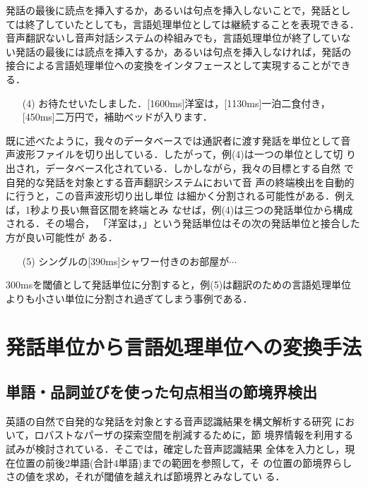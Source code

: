 発話の最後に読点を挿入するか，あるいは句点を挿入しないことで，発話とし
ては終了していたとしても，言語処理単位としては継続することを表現できる．
音声翻訳ないし音声対話システムの枠組みでも，言語処理単位が終了していな
い発話の最後には読点を挿入するか，あるいは句点を挿入しなければ，発話の
接合による言語処理単位への変換をインタフェースとして実現することができ
る．

\begin{itemize}
\item[(4)] お待たせいたしました．[1600ms]洋室は，[1130ms]一泊二食付き，
[450ms]二万円で，補助ベッドが入ります．
\end{itemize}

既に述べたように，我々のデータベースでは通訳者に渡す発話を単位として音
声波形ファイルを切り出している．したがって，例(4)は一つの単位として切
り出され，データベース化されている．しかしながら，我々の目標とする自然
で自発的な発話を対象とする音声翻訳システム\cite{Takezawa98a}において音
声の終端検出を自動的に行う\cite{Reaves98}と，この音声波形切り出し単位
は細かく分割される可能性がある．例えば，1秒より長い無音区間を終端とみ
なせば\cite{Reaves98}，例(4)は三つの発話単位から構成される．その場合，
「洋室は，」という発話単位はその次の発話単位と接合した方が良い可能性が
ある．

\begin{itemize}
\item[(5)] シングルの[390ms]シャワー付きのお部屋が$\cdots$
\end{itemize}

300msを閾値として発話単位に分割すると，例(5)は翻訳のための言語処理単位
よりも小さい単位に分割され過ぎてしまう事例である．

\section{発話単位から言語処理単位への変換手法}

\subsection{単語・品詞並びを使った句点相当の節境界検出}

英語の自然で自発的な発話を対象とする音声認識結果を構文解析する研究
\cite{Lavie96}において，ロバストなパーザの探索空間を削減するために，節
境界情報を利用する試みが検討されている．そこでは，確定した音声認識結果
全体を入力とし，現在位置の前後2単語(合計4単語)までの範囲を参照して，そ
の位置の節境界らしさの値を求め，それが閾値を越えれば節境界とみなしてい
る．

